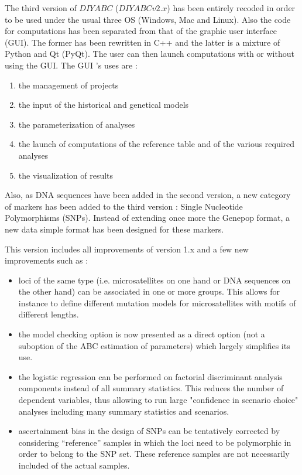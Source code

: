 \documentclass [a4paper]{report}
\begin{document}
 The third version of $DIYABC$ ($DIYABCv2.x$)  has been entirely recoded in order to be used under the usual three OS (Windows, Mac and Linux). Also the code for computations has been separated from that of the graphic user interface (GUI). The former has been rewritten in C++ and the latter is a mixture of Python and Qt (PyQt). The user can then launch computations with or without using the GUI. The GUI 's uses are : 

\begin{enumerate}
\item the management of projects
\item the input of the historical and genetical models
\item the parameterization of analyses
\item the launch of computations  of the reference table and of the various required analyses
\item the visualization of results
\end{enumerate}

Also, as DNA sequences have been added in the second version, a new category of markers has been added to the third version : Single Nucleotide Polymorphisms (SNPs). Instead of extending once more the Genepop format, a new data simple format has been designed for these markers.  

This version includes all improvements of version 1.x and a few new improvements such as :
\begin{itemize}
\item loci of the same type (i.e. microsatellites on one hand or DNA sequences on the other hand) can be associated in one or more groups. This allows for instance to define different mutation models for microsatellites with motifs of different lengths.
\item  the model checking option is now presented as a direct option (not a suboption of the ABC estimation of parameters) which largely simplifies its use.
\item the logistic regression can be performed on factorial discriminant analysis components instead of all summary statistics. This reduces the number of dependent variables, thus allowing to run large "confidence in scenario choice" analyses including many summary statistics and scenarios.
\item ascertainment bias in the design of SNPs can be tentatively corrected by considering ``reference'' samples in which the loci need to be polymorphic in order to belong to the SNP set. These reference samples are not necessarily included of the actual samples.
\end{itemize}
\end{document}
